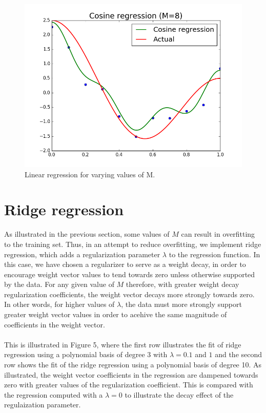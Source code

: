 \documentclass{article}
\begin{document}
\begin{figure}[width=\linewidth]
\begin{multicols}{2}
  \includegraphics[width=1.2\linewidth]{code/P2/cosine_regression,8.png}
\end{multicols}
\caption{Linear regression for varying values of M.}
\end{figure}


\section{Ridge regression}
As illustrated in the previous section, some values of $M$ can result in overfitting to the training set. Thus, in an attempt to reduce overfitting, we implement ridge regression, which adds a regularization parameter $\lambda$ to the regression function. In this case, we have chosen a regularizer to serve as a weight decay, in order to encourage weight vector values to tend towards zero unless otherwise supported by the data. For any given value of $M$ therefore, with greater weight decay regularization coefficients, the weight vector decays more strongly towards zero. In other words, for higher values of $\lambda$, the data must more strongly support greater weight vector values in order to acehive the same magnitude of coefficients in the weight vector. \\ \\
This is illustrated in Figure 5, where the first row illustrates the fit of ridge regression using a polynomial basis of degree 3 with $\lambda = 0.1$ and $1$ and the second row shows the fit of the ridge regression using a polynomial basis of degree 10. As illustrated, the weight vector coefficients in the regression are dampened towards zero with greater values of the regularization coefficient. This is compared with the regression computed with a $\lambda = 0$ to illustrate the decay effect of the regulaization parameter.
\end{document}
